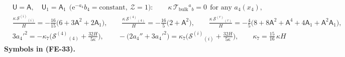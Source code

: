 \documentclass[
  10pt,
]{article}
\begin{document}
\[
\begin{aligned}
&\mathsf{U} = \mathsf{A},\quad \mathsf{U}_1 = \mathsf{A}_1\ \ \big(\mathrm{e}^{-a_4}b_4 = \text{constant},\ \mathcal{Z} = 1\big):\qquad
 \kappa\,\mathcal{T}_{\mathrm{bulk}}{}^a{}_b = 0\ \ \text{for any } a_4(x_4),\\
&\frac{\kappa\,\mathcal{S}^{(i)}{}_{(i)}}{H} = -\frac{16}{15}\big(6 + 3\mathsf{A}^2 + 2\mathsf{A}_1\big),\qquad
 \frac{\kappa\,\mathcal{S}^{(4)}{}_{(4)}}{H} = -\frac{16}{5}\big(2 + \mathsf{A}^2\big),\qquad
 \frac{\kappa\,\mathcal{S}^{(r)}{}_{(r)}}{H} = -\frac45\big(8 + 8\mathsf{A}^2 + \mathsf{A}^4 + 4\mathsf{A}_1 + \mathsf{A}^2\mathsf{A}_1\big),\\
&3a_4'^2 = -\kappa_7\Big(\mathcal{S}^{(4)}{}_{(4)} + \frac{32H}{5\kappa}\Big),\qquad
 -\big(2a_4'' + 3a_4'^2\big) = \kappa_7\Big(\mathcal{S}^{(i)}{}_{(i)} + \frac{32H}{5\kappa}\Big),\qquad \kappa_7 = \frac{15}{16}\,\kappa H
\end{aligned} \tag{FE-33}
\] \textbf{Symbols in (FE-33).}
\end{document}
